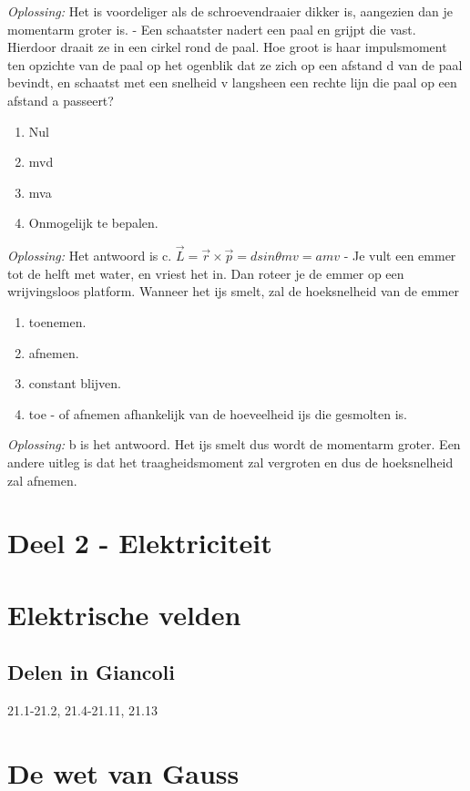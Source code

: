 \documentclass[12pt,a4paper]{article}
\begin{document}
	\textit{Oplossing:} Het is voordeliger als de schroevendraaier dikker is, aangezien dan je momentarm groter is. 
	\newline
	- Een schaatster nadert een paal en grijpt die vast. Hierdoor draait ze in een cirkel rond de paal. Hoe groot is haar impulsmoment ten opzichte van de paal op het ogenblik dat ze zich op een afstand d van de paal bevindt, en schaatst met een snelheid v langsheen een rechte lijn die paal op een afstand a passeert?
	\begin{enumerate}[label=\alph*]
		\item Nul
		\item mvd
		\item mva
		\item Onmogelijk te bepalen. 
	\end{enumerate}
	\textit{Oplossing:} Het antwoord is c. \(\vec{L} = \vec{r} \times \vec{p} = d sin\theta m v = amv\)
	\newline
	- Je vult een emmer tot de helft met water, en vriest het in. Dan roteer je de emmer op een wrijvingsloos platform. Wanneer het ijs smelt, zal de hoeksnelheid van de emmer
	\begin{enumerate}[label=\alph*]
		\item toenemen.
		\item afnemen.
		\item constant blijven.
		\item toe - of afnemen afhankelijk van de hoeveelheid ijs die gesmolten is. 
	\end{enumerate}
	\textit{Oplossing:} b is het antwoord. Het ijs smelt dus wordt de momentarm groter. Een andere uitleg is dat het traagheidsmoment zal vergroten en dus de hoeksnelheid zal afnemen. 
    \newpage


    \section{Deel 2 - Elektriciteit}


    \section{Elektrische velden}

    \subsection{Delen in Giancoli}
    21.1-21.2, 21.4-21.11, 21.13


    \section{De wet van Gauss}
\end{document}
